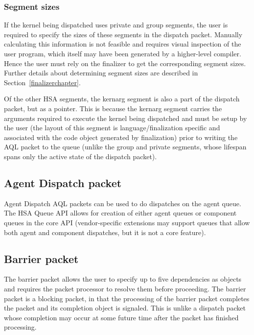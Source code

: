 \documentclass[draft]{book}
\newcommand{\mariotodo}[1]{\todo[color=CarnationPink]{#1}}
\begin{document}
\hypertarget{segment-sizes}{}\subsubsection{Segment sizes}
\label{segment-sizes}

If the kernel being dispatched uses private and group segments, the user is
required to specify the sizes of these segments in the dispatch
packet. Manually calculating this information is not feasible and requires
visual inspection of the user program, which itself may have been generated by a
higher-level compiler. Hence the user must rely on the finalizer to get the
corresponding segment sizes. Further details about determining segment sizes are
described in Section~\ref{finalizerchapter}.

Of the other HSA segments, the kernarg segment is also a part of the dispatch
packet, but as a pointer. This is because the kernarg segment carries the
arguments required to execute the kernel being dispatched and must be setup by
the user (the layout of this segment is language/finalization specific and
associated with the code object generated by finalization) prior to writing the
AQL packet to the queue (unlike the group and private segments, whose lifespan
spans only the active state of the dispatch packet). %

\hypertarget{agent-packet}{}\subsection{Agent Dispatch packet}
\label{agent-packet}

Agent Dispatch AQL packets can be used to do dispatches on the agent queue. The
HSA Queue API allows for creation of either agent queues or component queues in
the core API (vendor-specific extensions may support queues that allow both
agent and component dispatches, but it is not a core feature).

\hypertarget{barrier-packet}{}\subsection{Barrier packet}
\label{barrier-packet}

The barrier packet allows the user to specify up to five dependencies as
 objects and requires the packet processor to
resolve them before proceeding. The barrier packet is a blocking packet, in that
the processing of the barrier packet completes the packet and its completion
object is signaled. This is unlike a dispatch packet whose completion may occur
at some future time after the packet has finished processing.
\end{document}
